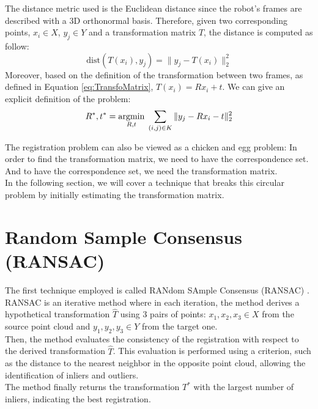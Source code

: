 The distance metric used is the Euclidean distance since the robot's frames are described with a 3D orthonormal basis. 
Therefore, given two corresponding points, $x_i \in X$, $y_j \in Y$ and a transformation matrix $T$, the distance is computed as follow:
\begin{equation}
    \text{dist}(T(x_i),y_j) =\| y_j - T(x_i) \|_2^2
\end{equation}
Moreover, based on the definition of the transformation between two frames, as defined in Equation \ref{eq:TransfoMatrix}, $T(x_i) = Rx_i + t$. We can give an explicit definition of the problem:
\begin{equation}
    R^*,t^* = \operatorname*{argmin}_{R,t} \; \sum_{(i,j) \in K} \| y_j - Rx_i - t\|_2^2
\end{equation}

The registration problem can also be viewed as a chicken and egg problem: In order to find the transformation matrix, we need to have the correspondence set. And to have the correspondence set, we need the transformation matrix.\\

In the following section, we will cover a technique that breaks this circular problem by initially estimating the transformation matrix.
\section{Random Sample Consensus (RANSAC)}
The first technique employed is called RANdom SAmple Consensus (RANSAC) \cite{ransac_registration}.\\
RANSAC is an iterative method where in each iteration, the method derives a hypothetical transformation $\hat{T}$ using  3 pairs of points: $x_1,x_2,x_3 \in X$ from the source point cloud and $y_1, y_2, y_3 \in Y$ from the target one.\\

Then, the method evaluates the consistency of the registration with respect to the derived transformation $\hat{T}$. This evaluation is performed using a criterion, such as the distance to the nearest neighbor in the opposite point cloud, allowing the identification of inliers and outliers.\\

The method finally returns the transformation $T^*$ with the largest number of inliers, indicating the best registration.

